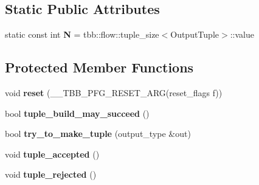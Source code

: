 \subsection*{Static Public Attributes}
\begin{DoxyCompactItemize}
\item 
\hypertarget{classinternal_1_1join__node__FE_3_01queueing_00_01InputTuple_00_01OutputTuple_01_4_a92f03727171b19d12fb6d17a48727c81}{}static const int {\bfseries N} = tbb\+::flow\+::tuple\+\_\+size$<$Output\+Tuple$>$\+::value\label{classinternal_1_1join__node__FE_3_01queueing_00_01InputTuple_00_01OutputTuple_01_4_a92f03727171b19d12fb6d17a48727c81}

\end{DoxyCompactItemize}
\subsection*{Protected Member Functions}
\begin{DoxyCompactItemize}
\item 
\hypertarget{classinternal_1_1join__node__FE_3_01queueing_00_01InputTuple_00_01OutputTuple_01_4_aa0a65e4750aeca2eae17b28b8ad5576e}{}void {\bfseries reset} (\+\_\+\+\_\+\+T\+B\+B\+\_\+\+P\+F\+G\+\_\+\+R\+E\+S\+E\+T\+\_\+\+A\+R\+G(reset\+\_\+flags f))\label{classinternal_1_1join__node__FE_3_01queueing_00_01InputTuple_00_01OutputTuple_01_4_aa0a65e4750aeca2eae17b28b8ad5576e}

\item 
\hypertarget{classinternal_1_1join__node__FE_3_01queueing_00_01InputTuple_00_01OutputTuple_01_4_a3e5bd199ccec0487aeaa71bf742c70e4}{}bool {\bfseries tuple\+\_\+build\+\_\+may\+\_\+succeed} ()\label{classinternal_1_1join__node__FE_3_01queueing_00_01InputTuple_00_01OutputTuple_01_4_a3e5bd199ccec0487aeaa71bf742c70e4}

\item 
\hypertarget{classinternal_1_1join__node__FE_3_01queueing_00_01InputTuple_00_01OutputTuple_01_4_a6a78efb0b6b584727eafd3f85255658c}{}bool {\bfseries try\+\_\+to\+\_\+make\+\_\+tuple} (output\+\_\+type \&out)\label{classinternal_1_1join__node__FE_3_01queueing_00_01InputTuple_00_01OutputTuple_01_4_a6a78efb0b6b584727eafd3f85255658c}

\item 
\hypertarget{classinternal_1_1join__node__FE_3_01queueing_00_01InputTuple_00_01OutputTuple_01_4_a651846a0313f86f94ff7a274592ad943}{}void {\bfseries tuple\+\_\+accepted} ()\label{classinternal_1_1join__node__FE_3_01queueing_00_01InputTuple_00_01OutputTuple_01_4_a651846a0313f86f94ff7a274592ad943}

\item 
\hypertarget{classinternal_1_1join__node__FE_3_01queueing_00_01InputTuple_00_01OutputTuple_01_4_af1fbd30068d93c45082e64c0760a785f}{}void {\bfseries tuple\+\_\+rejected} ()\label{classinternal_1_1join__node__FE_3_01queueing_00_01InputTuple_00_01OutputTuple_01_4_af1fbd30068d93c45082e64c0760a785f}

\end{DoxyCompactItemize}
